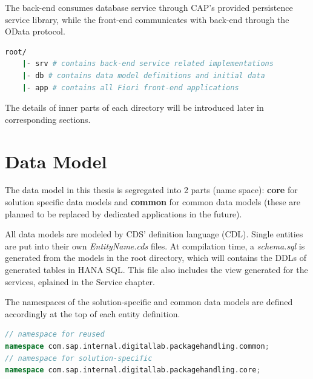 
The back-end consumes database service through CAP's provided persistence service library, while the front-end communicates with back-end through the OData protocol.






\begin{lstlisting}[language={bash}]
root/
    |- srv # contains back-end service related implementations
    |- db # contains data model definitions and initial data
    |- app # contains all Fiori front-end applications
\end{lstlisting}

The details of inner parts of each directory will be introduced later in corresponding sections.

\section{Data Model}
\label{sec:D-db}

The data model in this thesis is segregated into 2 parts (name space): \textbf{core} for solution specific data models and \textbf{common} for common data models 
(these are planned to be replaced by dedicated applications in the future).

All data models are modeled by CDS' definition language (CDL). Single entities are put into their own \textit{EntityName.cds} files. 
At compilation time, a \textit{schema.sql} is generated from the models in the root directory, which will contains the DDLs of generated tables in HANA SQL. This file also includes the view generated for the services, eplained in the Service chapter.


The namespaces of the solution-specific and common data models are defined accordingly at the top of each entity definition.

\begin{lstlisting}[language={c++}]
// namespace for reused
namespace com.sap.internal.digitallab.packagehandling.common; 
// namespace for solution-specific
namespace com.sap.internal.digitallab.packagehandling.core; 
\end{lstlisting}



